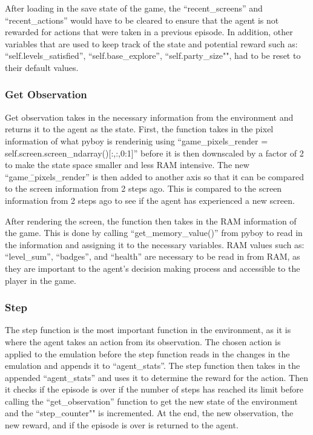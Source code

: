 After loading in the save state of the game, the ``recent\_screens'' and ``recent\_actions'' would have to be cleared to ensure that the agent is not rewarded for actions that were taken in a previous episode. In addition, other variables that are used to keep track of the state and potential reward such as: ``self.levels\_satisfied'', ``self.base\_explore'', ``self.party\_size"", had to be reset to their default values. 

\subsubsection*{Get Observation}

Get observation takes in the necessary information from the environment and returns it to the agent as the state. First, the function takes in the pixel information of what pyboy is renderinig using ``game\_pixels\_render = self.screen.screen\_ndarray()[:,:,0:1]'' before it is then downscaled by a factor of 2 to make the state space smaller and less RAM intensive. The new ``game\=\_pixels\_render'' is then added to another axis so that it can be compared to the screen information from 2 steps ago. This is compared to the screen information from 2 steps ago to see if the agent has experienced a new screen.

After rendering the screen, the function then takes in the RAM information of the game. This is done by calling ``get\_memory\_value()'' from pyboy to read in the information and assigning it to the necessary variables. RAM values such as: ``level\_sum'', ``badges'', and ``health'' are necessary to be read in from RAM, as they are important to the agent's decision making process and accessible to the player in the game.

\subsubsection*{Step}

The step function is the most important function in the environment, as it is where the agent takes an action from its observation. The chosen action is applied to the emulation before the step function reads in the changes in the emulation and appends it to ``agent\_stats''. The step function then takes in the appended ``agent\_stats'' and uses it to determine the reward for the action. Then it checks if the episode is over if the number of steps has reached its limit before calling the ``get\_observation'' function to get the new state of the environment and the ``step\_counter"" is incremented. At the end, the new observation, the new reward, and if the episode is over is returned to the agent.

